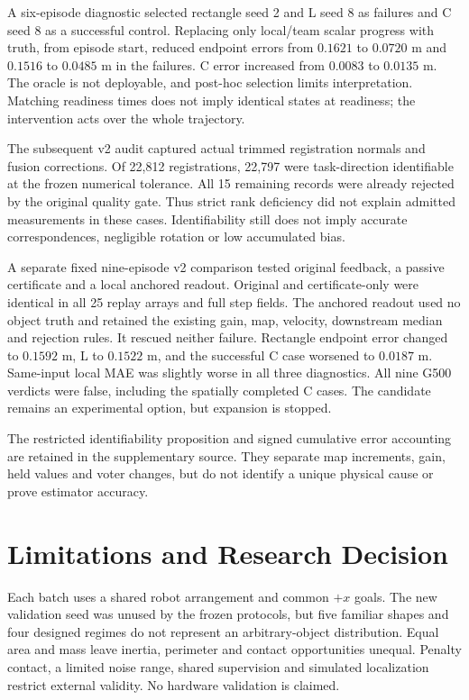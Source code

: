\documentclass[letterpaper,10pt,conference]{ieeeconf}
\begin{document}
A six-episode diagnostic selected rectangle seed 2 and L seed 8 as failures and C seed 8 as a successful control. Replacing only local/team scalar progress with truth, from episode start, reduced endpoint errors from $0.1621$ to $0.0720$ m and $0.1516$ to $0.0485$ m in the failures. C error increased from $0.0083$ to $0.0135$ m. The oracle is not deployable, and post-hoc selection limits interpretation. Matching readiness times does not imply identical states at readiness; the intervention acts over the whole trajectory.

The subsequent v2 audit captured actual trimmed registration normals and fusion corrections. Of 22,812 registrations, 22,797 were task-direction identifiable at the frozen numerical tolerance. All 15 remaining records were already rejected by the original quality gate. Thus strict rank deficiency did not explain admitted measurements in these cases. Identifiability still does not imply accurate correspondences, negligible rotation or low accumulated bias.

A separate fixed nine-episode v2 comparison tested original feedback, a passive certificate and a local anchored readout. Original and certificate-only were identical in all 25 replay arrays and full step fields. The anchored readout used no object truth and retained the existing gain, map, velocity, downstream median and rejection rules. It rescued neither failure. Rectangle endpoint error changed to $0.1592$ m, L to $0.1522$ m, and the successful C case worsened to $0.0187$ m. Same-input local MAE was slightly worse in all three diagnostics. All nine G500 verdicts were false, including the spatially completed C cases. The candidate remains an experimental option, but expansion is stopped.

The restricted identifiability proposition and signed cumulative error accounting are retained in the supplementary source. They separate map increments, gain, held values and voter changes, but do not identify a unique physical cause or prove estimator accuracy.

\section{Limitations and Research Decision}
Each batch uses a shared robot arrangement and common $+x$ goals. The new validation seed was unused by the frozen protocols, but five familiar shapes and four designed regimes do not represent an arbitrary-object distribution. Equal area and mass leave inertia, perimeter and contact opportunities unequal. Penalty contact, a limited noise range, shared supervision and simulated localization restrict external validity. No hardware validation is claimed.
\end{document}
